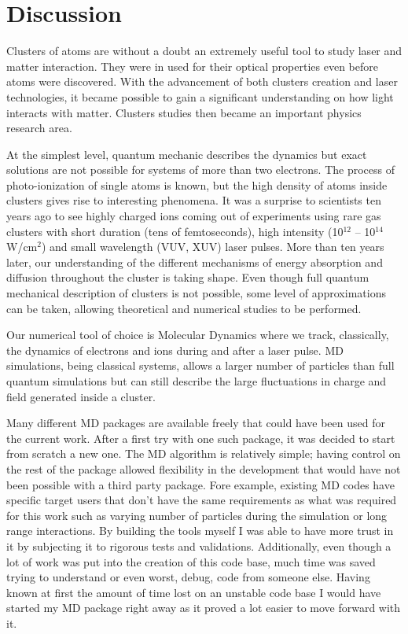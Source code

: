 \section{Discussion}

Clusters of atoms are without a doubt an extremely useful tool to study
laser and matter interaction. They were in used for their optical properties
even before atoms were discovered. With the advancement of both clusters creation
and laser technologies, it became possible to gain a significant understanding
on how light interacts with matter. Clusters studies then became an important
physics research area.

At the simplest level, quantum mechanic describes the dynamics but exact solutions
are not possible for systems of more than two electrons.
The process of photo-ionization of single atoms is known, but the high density
of atoms inside clusters gives rise to interesting phenomena. It was a surprise
to scientists ten years ago to see highly charged ions coming out of experiments
using rare gas clusters with short duration (tens of femtoseconds), high intensity
(10$^{12}$ -- 10$^{14}$ W/cm$^2$) and small wavelength (VUV, XUV) laser pulses.
More than ten years later, our understanding of the different mechanisms of energy
absorption and diffusion throughout the cluster is taking shape. Even though full
quantum mechanical description of clusters is not possible, some level of approximations
can be taken, allowing theoretical and numerical studies to be performed.

Our numerical tool of choice is Molecular Dynamics where we track, classically,
the dynamics of electrons and ions during and after a laser pulse. MD simulations,
being classical systems, allows a larger number of particles than full quantum
simulations but can still describe the large fluctuations in charge and field
generated inside a cluster.

Many different MD packages are available freely that could have been used for
the current work. After a first try with one such package, it was decided to
start from scratch a new one. The MD algorithm is relatively simple; having
control on the rest of the package allowed flexibility in the development that
would have not been possible with a third party package. Fore example, existing
MD codes have specific target users that don't have the same requirements as what
was required for this work such as varying number of particles during the
simulation or long range interactions. By building the tools myself I was able
to have more trust in it by subjecting it to rigorous tests and validations.
Additionally, even though a lot of work was put into the creation of this code
base, much time was saved trying to understand or even worst, debug, code from
someone else. Having known at first the amount of time lost on an unstable code
base I would have started my MD package right away as it proved a lot easier
to move forward with it.


